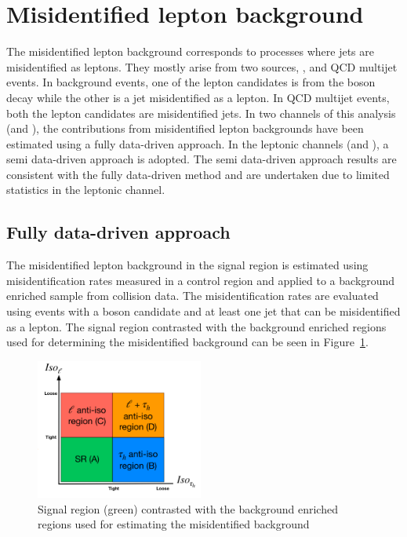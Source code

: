 \section{Misidentified lepton background}
The misidentified lepton background corresponds to processes where jets are misidentified as leptons. They mostly arise from two sources, \wjets, and QCD multijet events. In \wjets background events, one of the lepton candidates is from the \PW boson decay while the other is a jet misidentified as a lepton. In QCD multijet events, both the lepton candidates are misidentified jets. In two channels of this analysis (\muhad and \ehad), the contributions from misidentified lepton backgrounds have been estimated using a fully data-driven approach. In the leptonic channels (\mue and \emu), a semi data-driven approach is adopted. The semi data-driven approach results are consistent with the fully data-driven method and are undertaken due to limited statistics in the leptonic channel.

\subsection{Fully data-driven approach}
The misidentified lepton background in the signal region is estimated using misidentification rates measured in a \zjets control region and applied to a background enriched sample from collision data. The misidentification rates are evaluated using events with a \PZ boson candidate and at least one jet that can be misidentified as a lepton. The signal region contrasted with the background enriched regions used for determining the misidentified background can be seen in Figure~\ref{fig:fake}.

\begin{figure}[hbtp!]
  \centering
  \includegraphics[width=0.49\textwidth]{plots/chapter7/Fake/Fake.png}
  \caption{Signal region (green) contrasted with the background enriched regions used for estimating the misidentified background}
  \label{fig:fake}
\end{figure}

